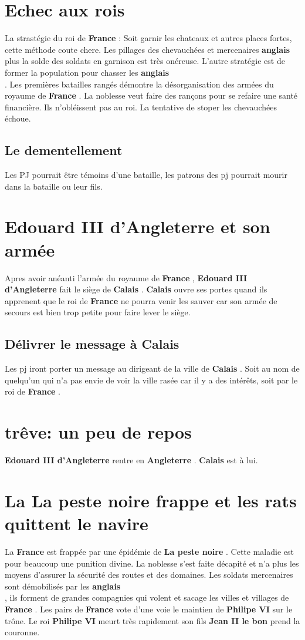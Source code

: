 \documentclass[oneside,12pt]{book}
\newcommand{\France}{\textbf{France} }
\newcommand{\Angleterre}{\textbf{Angleterre} }
\newcommand{\Calais}{\textbf{Calais} }
\newcommand{\PhilipeVI}{\textbf{Philipe VI} }%
\newcommand{\JeanII}{\textbf{Jean II le bon} }
\newcommand{\EdouardIII}{\textbf{Edouard III d'Angleterre} }%
\newcommand{\Peste}{\textbf{La peste noire} }
\newcommand{\Anglais}{\textbf{anglais\\} }
\begin{document}
\begin{flushleft}
\section{Echec aux rois }
La strastégie du roi de \France: Soit garnir les chateaux et autres places fortes, cette méthode coute chere. Les pillages des 
chevauchées et mercenaires \Anglais plus la solde des soldats en garnison est très onéreuse. L'autre stratégie est de former la 
population pour chasser les \Anglais. Les premières batailles rangés démontre la désorganisation des armées du royaume de 
\France. La noblesse veut faire des rançons pour se refaire une santé financière. Ils n'obléissent pas au roi.  
La tentative de stoper les chevauchées échoue. 

\subsection{Le dementellement}
Les PJ pourrait être témoins d'une bataille, les patrons des pj pourrait mourir dans la bataille ou leur fils.

\section{\EdouardIII et son armée}
Apres avoir anéanti l'armée du royaume de \France, \EdouardIII fait le siège de \Calais.
\Calais ouvre ses portes quand ils apprenent que le roi de \France ne pourra venir les sauver car son armée de secours est bien 
trop petite pour faire lever le siège.
 
\subsection{Délivrer le message à \Calais}
Les pj iront porter un message au dirigeant de la ville de \Calais. Soit au nom de quelqu'un qui n'a pas envie de voir la ville 
rasée car il y a des intérêts, soit par le roi de \France.  

\section{trêve: un peu de repos}
\EdouardIII rentre en \Angleterre. \Calais est à lui. 

\section{La \Peste frappe et les rats quittent le navire}
La \France est frappée par une épidémie de \Peste. Cette maladie est pour beaucoup une punition divine. La noblesse s'est faite 
décapité et n'a plus les moyens d'assurer la sécurité des routes et des domaines. Les soldats mercenaires sont démobilisés par 
les \Anglais, ils forment de grandes compagnies qui volent et sacage les villes et villages de \France. 
Les pairs de \France vote d'une voie le maintien de \PhilipeVI sur le trône. Le roi \PhilipeVI meurt très rapidement son fils 
\JeanII prend la couronne. 


\end{flushleft}
\end{document}

